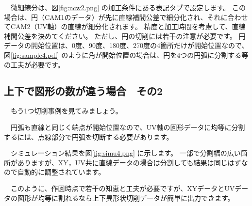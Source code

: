 　微細線分は、図\ref{fig:ncw2.png} の加工条件にある表記タブで設定します。
この場合は、円（CAM1のデータ）が先に直線補間公差で細分化され、それに合わせてCAM2（UV軸）の直線が細分化されます。
精度と加工時間を考慮して、直線補間公差を決めてください。
ただし、円の切削には若干の注意が必要です。
円データの開始位置は、0度、90度、180度、270度の4箇所だけが開始位置なので、図\ref{fig:sample4.pdf} のように角が開始位置の場合は、円を4つの円弧に分割する等の工夫が必要です。

\begin{minipage}[t]{0.5\textwidth}
\end{minipage}
\begin{minipage}[t]{0.5\textwidth}
\end{minipage}

\subsection{上下で図形の数が違う場合　その2}
　もう1つ切削事例を見てみましょう。


　円弧も直線と同じく端点が開始位置なので、UV軸の図形データに均等に分割するには、点線部分で円弧を切断する必要があります。

　シミュレーション結果を図\ref{fig:simu4.png} に示します。
一部で分割幅の広い箇所がありますが、XY，UV共に直線データの場合は分割しても結果は同じはずなので自動的に調整されています。

　このように、作図時点で若干の知恵と工夫が必要ですが、XYデータとUVデータの図形が均等に割れるなら上下異形状切削データが簡単に出力できます。


